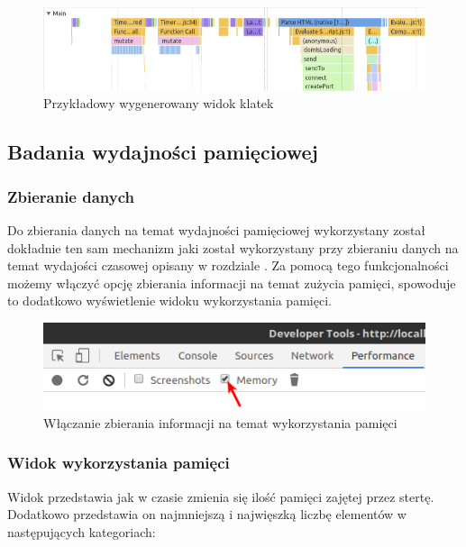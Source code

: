 \documentclass[polish, twoside, 12pt]{mwart}
\begin{document}
\begin{figure}[ht]
  \includegraphics[width=\textwidth]{chrome-devtools-performance-main-view.png}
	\caption{Przykładowy wygenerowany widok klatek}
\end{figure}

\subsection{Badania wydajności pamięciowej}

\subsubsection{Zbieranie danych}

Do zbierania danych na temat wydajności pamięciowej wykorzystany został dokładnie ten sam mechanizm jaki został wykorzystany przy zbieraniu danych na temat wydajości czasowej opisany w rozdziale \cite{gathering-time-performance-data}. Za pomocą tego funkcjonalności możemy włączyć opcję zbierania informacji na temat zużycia pamięci, spowoduje to dodatkowo wyświetlenie widoku wykorzystania pamięci.

\begin{figure}[ht]
  \includegraphics[width=\textwidth]{chrome-devtools-performance-memory-checkbox.png}
	\caption{Włączanie zbierania informacji na temat wykorzystania pamięci}
\end{figure}

\subsubsection{Widok wykorzystania pamięci}

Widok przedstawia jak w czasie zmienia się ilość pamięci zajętej przez stertę. Dodatkowo przedstawia on najmniejszą i najwięszką liczbę elementów w następujących kategoriach:
\end{document}
